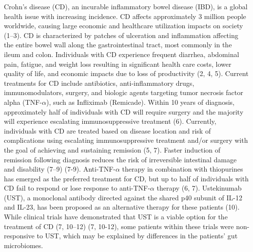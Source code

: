 \documentclass[11pt,]{article}
\begin{document}
Crohn's disease (CD), an incurable inflammatory bowel disease (IBD), is
a global health issue with increasing incidence. CD affects
approximately 3 million people worldwide, causing large economic and
healthcare utilization impacts on society (1--3). CD is characterized by
patches of ulceration and inflammation affecting the entire bowel wall
along the gastrointestinal tract, most commonly in the ileum and colon.
Individuals with CD experience frequent diarrhea, abdominal pain,
fatigue, and weight loss resulting in significant health care costs,
lower quality of life, and economic impacts due to loss of productivity
(2, 4, 5). Current treatments for CD include antibiotics,
anti-inflammatory drugs, immunomodulators, surgery, and biologic agents
targeting tumor necrosis factor alpha (TNF-\({\alpha}\)), such as
Infliximab (Remicade). Within 10 years of diagnosis, approximately half
of individuals with CD will require surgery and the majority will
experience escalating immunosuppressive treatment (6). Currently,
individuals with CD are treated based on disease location and risk of
complications using escalating immunosuppressive treatment and/or
surgery with the goal of achieving and sustaining remission (5, 7).
Faster induction of remission following diagnosis reduces the risk of
irreversible intestinal damage and disability (7--9) (7-9).
Anti-TNF-\({\alpha}\) therapy in combination with thiopurines has
emerged as the preferred treatment for CD, but up to half of individuals
with CD fail to respond or lose response to anti-TNF-\({\alpha}\)
therapy (6, 7). Ustekinumab (UST), a monoclonal antibody directed
against the shared p40 subunit of IL-12 and IL-23, has been proposed as
an alternative therapy for these patients (10). While clinical trials
have demonstrated that UST is a viable option for the treatment of CD
(7, 10--12) (7, 10-12), some patients within these trials were
non-responsive to UST, which may be explained by differences in the
patients' gut microbiomes.
\end{document}
